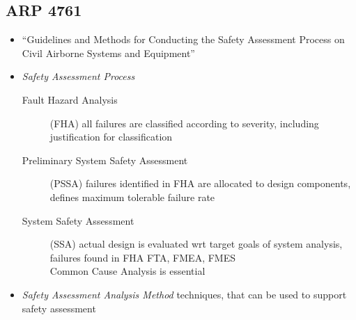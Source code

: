 \documentclass[a4paper, 10pt]{article}
\begin{document}
\subsection*{ARP 4761}
\begin{itemize}
    \item ``Guidelines and Methods for Conducting the Safety Assessment Process on Civil Airborne Systems and Equipment''
    \item \emph{Safety Assessment Process}
    \begin{description}
        \item[Fault Hazard Analysis] (FHA) all failures are classified according to severity, including justification for classification
        \item[Preliminary System Safety Assessment] (PSSA) failures identified in FHA are allocated to design components, defines maximum tolerable failure rate
        \item[System Safety Assessment] (SSA) actual design is evaluated wrt target goals of system analysis, failures found in FHA \follows FTA, FMEA, FMES
        \\ Common Cause Analysis is essential
    \end{description}
    \item \emph{Safety Assessment Analysis Method} techniques, that can be used to support safety assessment
\end{itemize}
\end{document}
